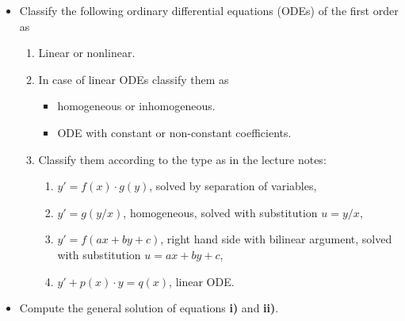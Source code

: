 {
\begin{itemize}
\item[\textbf{1)}] Classify the following ordinary differential equations (ODEs) of the first order as
\begin{enumerate}
\item[\textbf{a)}] Linear or nonlinear.
\item[\textbf{b)}] In case of linear ODEs classify them as 
\begin{itemize}
\item homogeneous or inhomogeneous.
\item ODE with constant or non-constant coefficients.
\end{itemize}
\item[\textbf{c)}] Classify them according to the type as in the lecture notes:
\begin{enumerate}
\item $y'= f(x)\cdot g(y)$, solved by separation of variables,
\item $y'=g(y/x)$, homogeneous, solved with substitution $u=y/x$,
\item $y'=f(ax+by+c)$, right hand side with bilinear argument, solved with substitution $u=ax+by+c$,
\item $y'+p(x) \cdot y = q(x)$, linear ODE.
\end{enumerate}
\end{enumerate}
\begin{multicols}{2}
\end{multicols}
\item[\textbf{2)}] Compute the general solution of equations \textbf{i)} and \textbf{ii)}.
\end{itemize}
}



